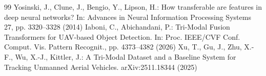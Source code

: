 \begin{thebibliography}{99}
 Yosinski, J., Clune, J., Bengio, Y., Lipson, H.: How transferable are features in deep neural networks? In: Advances in Neural Information Processing Systems 27, pp. 3320--3328 (2014)
 Iaboni, C., Abichandani, P.: Tri-Modal Fusion Transformers for UAV-based Object Detection. In: Proc. IEEE/CVF Conf. Comput. Vis. Pattern Recognit., pp. 4373--4382 (2026)
 Xu, T., Gu, J., Zhu, X.-F., Wu, X.-J., Kittler, J.: A Tri-Modal Dataset and a Baseline System for Tracking Unmanned Aerial Vehicles. arXiv:2511.18344 (2025)
\end{thebibliography}

